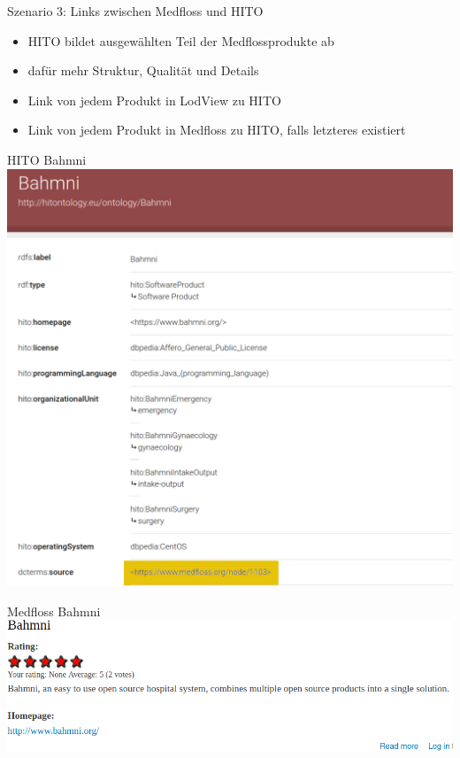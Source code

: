 \documentclass[aspectratio=1610,12pt]{beamer}
\begin{document}
\begin{frame}{Szenario 3: Links zwischen Medfloss und HITO}
\begin{itemize}
\item HITO bildet ausgewählten Teil der Medflossprodukte ab
\item dafür mehr Struktur, Qualität und Details
\item Link von jedem Produkt in LodView zu HITO
\item Link von jedem Produkt in Medfloss zu HITO, falls letzteres existiert
\end{itemize}
\end{frame}

\begin{frame}{HITO Bahmni}
  \vspace{-0.5cm}
  \centering
  \includegraphics[height=.8\textheight]{img/hito-bahmni.png}
\end{frame}

\begin{frame}{Medfloss Bahmni}
  \includegraphics[width=\textwidth]{img/medfloss-bahmni.png}
\end{frame}
\end{document}
